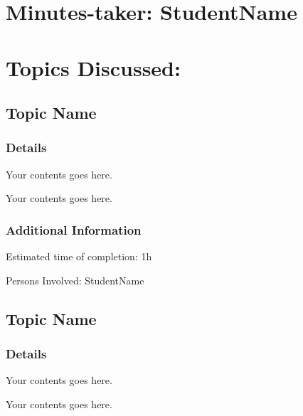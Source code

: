\documentclass[11pt]{meetingmins} %
\begin{document}
\maketitle

\section{Minutes-taker: StudentName}

\section{Topics Discussed:}

\subsection{Topic Name}
    \subsubsection{Details}
        \begin{hiddensubitems}
            \item
                Your contents goes here.
            \item
                Your contents goes here.
        \end{hiddensubitems}
        
    \subsubsection{Additional Information}
        \begin{hiddensubitems}
            \item
                Estimated time of completion: 1h
            \item
                Persons Involved: StudentName
        \end{hiddensubitems}

\subsection{Topic Name}
    \subsubsection{Details}
        \begin{hiddensubitems}
            \item
                Your contents goes here.
            \item
                Your contents goes here.
        \end{hiddensubitems}
        
\end{document}
